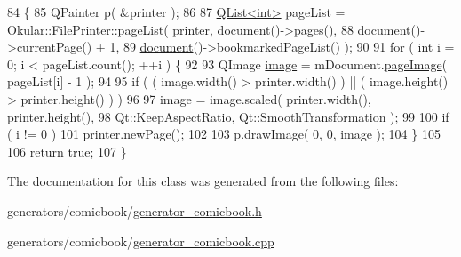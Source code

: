 \begin{DoxyCode}
84 \{
85     QPainter p( &printer );
86 
87     \hyperlink{classQList}{QList<int>} pageList = \hyperlink{classOkular_1_1FilePrinter_aed485e5e3fbe591b16e15915e318a1b7}{Okular::FilePrinter::pageList}( printer, 
      \hyperlink{classOkular_1_1Generator_a4248672ef04e62660d51f16c0a862bbe}{document}()->pages(),
88                                                          \hyperlink{classOkular_1_1Generator_a4248672ef04e62660d51f16c0a862bbe}{document}()->currentPage() + 1,
89                                                          \hyperlink{classOkular_1_1Generator_a4248672ef04e62660d51f16c0a862bbe}{document}()->bookmarkedPageList() );
90 
91     \textcolor{keywordflow}{for} ( \textcolor{keywordtype}{int} i = 0; i < pageList.count(); ++i ) \{
92 
93         QImage \hyperlink{classComicBookGenerator_a473ac38c97610d3870fa01def287c413}{image} = mDocument.\hyperlink{classComicBook_1_1Document_ae572a3b695f4300eb3ddf76bbcd3b1dd}{pageImage}( pageList[i] - 1 );
94 
95         \textcolor{keywordflow}{if} ( ( image.width() > printer.width() ) || ( image.height() > printer.height() ) )
96 
97             image = image.scaled( printer.width(), printer.height(),
98                                   Qt::KeepAspectRatio, Qt::SmoothTransformation );
99 
100         \textcolor{keywordflow}{if} ( i != 0 )
101             printer.newPage();
102 
103         p.drawImage( 0, 0, image );
104     \}
105 
106     \textcolor{keywordflow}{return} \textcolor{keyword}{true};
107 \}
\end{DoxyCode}


The documentation for this class was generated from the following files\+:\begin{DoxyCompactItemize}
\item 
generators/comicbook/\hyperlink{generator__comicbook_8h}{generator\+\_\+comicbook.\+h}\item 
generators/comicbook/\hyperlink{generator__comicbook_8cpp}{generator\+\_\+comicbook.\+cpp}\end{DoxyCompactItemize}
